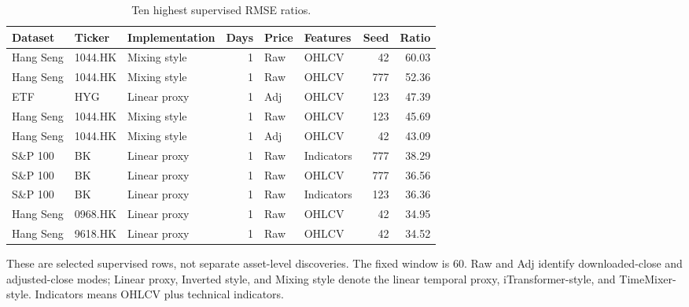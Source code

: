 \begin{table}[htbp]
\centering
\caption{Ten highest supervised RMSE ratios.}
\label{tab:worst_rows}
\small
\setlength{\tabcolsep}{4pt}
\begin{tabular}{lllrllrr}
\toprule
Dataset & Ticker & Implementation & Days & Price & Features & Seed & Ratio \\
\midrule
Hang Seng & 1044.HK & Mixing style & 1 & Raw & OHLCV & 42 & 60.03 \\
Hang Seng & 1044.HK & Mixing style & 1 & Raw & OHLCV & 777 & 52.36 \\
ETF & HYG & Linear proxy & 1 & Adj & OHLCV & 123 & 47.39 \\
Hang Seng & 1044.HK & Mixing style & 1 & Raw & OHLCV & 123 & 45.69 \\
Hang Seng & 1044.HK & Mixing style & 1 & Adj & OHLCV & 42 & 43.09 \\
S\&P 100 & BK & Linear proxy & 1 & Raw & Indicators & 777 & 38.29 \\
S\&P 100 & BK & Linear proxy & 1 & Raw & OHLCV & 777 & 36.56 \\
S\&P 100 & BK & Linear proxy & 1 & Raw & Indicators & 123 & 36.36 \\
Hang Seng & 0968.HK & Linear proxy & 1 & Raw & OHLCV & 42 & 34.95 \\
Hang Seng & 9618.HK & Linear proxy & 1 & Raw & OHLCV & 42 & 34.52 \\
\bottomrule
\end{tabular}
\par\smallskip\parbox{0.97\linewidth}{\footnotesize These are selected supervised rows, not separate asset-level discoveries. The fixed window is 60. Raw and Adj identify downloaded-close and adjusted-close modes; Linear proxy, Inverted style, and Mixing style denote the linear temporal proxy, iTransformer-style, and TimeMixer-style. Indicators means OHLCV plus technical indicators.}
\end{table}
